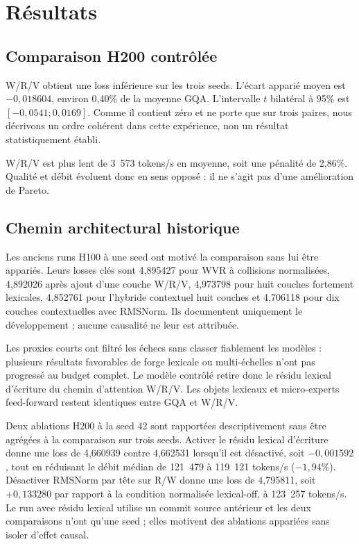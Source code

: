 \section{Résultats}
\label{sec:results}

\subsection{Comparaison H200 contrôlée}



W/R/V obtient une loss inférieure sur les trois seeds. L'écart apparié moyen est $-0,018604$, environ 0,40\% de la moyenne GQA. L'intervalle $t$ bilatéral à 95\% est $[-0,0541;0,0169]$. Comme il contient zéro et ne porte que sur trois paires, nous décrivons un ordre cohérent dans cette expérience, non un résultat statistiquement établi.

W/R/V est plus lent de 3~573 tokens/s en moyenne, soit une pénalité de 2,86\%. Qualité et débit évoluent donc en sens opposé : il ne s'agit pas d'une amélioration de Pareto.

\subsection{Chemin architectural historique}

Les anciens runs H100 à une seed ont motivé la comparaison sans lui être appariés. Leurs losses clés sont 4,895427 pour WVR à collisions normalisées, 4,892026 après ajout d'une couche W/R/V, 4,973798 pour huit couches fortement lexicales, 4,852761 pour l'hybride contextuel huit couches et 4,706118 pour dix couches contextuelles avec RMSNorm. Ils documentent uniquement le développement ; aucune causalité ne leur est attribuée.

Les proxies courts ont filtré les échecs sans classer fiablement les modèles : plusieurs résultats favorables de forge lexicale ou multi-échelles n'ont pas progressé au budget complet. Le modèle contrôlé retire donc le résidu lexical d'écriture du chemin d'attention W/R/V. Les objets lexicaux et micro-experts feed-forward restent identiques entre GQA et W/R/V.

Deux ablations H200 à la seed 42 sont rapportées descriptivement sans être agrégées à la comparaison sur trois seeds. Activer le résidu lexical d'écriture donne une loss de 4,660939 contre 4,662531 lorsqu'il est désactivé, soit $-0,001592$, tout en réduisant le débit médian de 121~479 à 119~121 tokens/s ($-1,94\%$). Désactiver RMSNorm par tête sur R/W donne une loss de 4,795811, soit $+0,133280$ par rapport à la condition normalisée lexical-off, à 123~257 tokens/s. Le run avec résidu lexical utilise un commit source antérieur et les deux comparaisons n'ont qu'une seed ; elles motivent des ablations appariées sans isoler d'effet causal.

